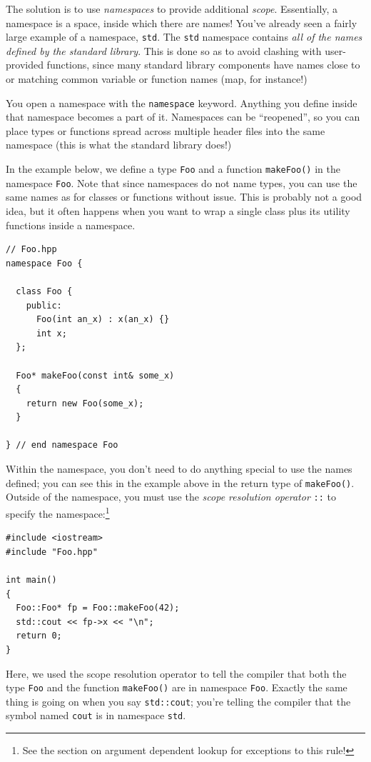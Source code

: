 \documentclass[a4paper]{scrartcl}
\begin{document}
The solution is to use \emph{namespaces} to provide additional \emph{scope}. Essentially, a namespace is a space, inside which there are names! You've already seen a fairly large example of a namespace, \verb|std|. The \verb|std| namespace contains \emph{all of the names defined by the standard library}. This is done so as to avoid clashing with user-provided functions, since many standard library components have names close to or matching common variable or function names (map, for instance!)

You open a namespace with the \verb|namespace| keyword. Anything you define inside that namespace becomes a part of it. Namespaces can be ``reopened'', so you can place types or functions spread across multiple header files into the same namespace (this is what the standard library does!)

In the example below, we define a type \verb|Foo| and a function \verb|makeFoo()| in the namespace \verb|Foo|. Note that since namespaces do not name types, you can use the same names as for classes or functions without issue. This is probably not a good idea, but it often happens when you want to wrap a single class plus its utility functions inside a namespace.

\begin{verbatim}
// Foo.hpp
namespace Foo {
  
  class Foo {
    public:
      Foo(int an_x) : x(an_x) {}
      int x;
  };

  Foo* makeFoo(const int& some_x)
  {
    return new Foo(some_x);
  }

} // end namespace Foo
\end{verbatim}

Within the namespace, you don't need to do anything special to use the names defined; you can see this in the example above in the return type of \verb|makeFoo()|. Outside of the namespace, you must use the \emph{scope resolution operator} \verb|::| to specify the namespace:\footnote{See the section on argument dependent lookup for exceptions to this rule!}

\begin{verbatim}
#include <iostream>
#include "Foo.hpp"

int main()
{
  Foo::Foo* fp = Foo::makeFoo(42);
  std::cout << fp->x << "\n";
  return 0;
}
\end{verbatim}

Here, we used the scope resolution operator to tell the compiler that both the type \verb|Foo| and the function \verb|makeFoo()| are in namespace \verb|Foo|. Exactly the same thing is going on when you say \verb|std::cout|; you're telling the compiler that the symbol named \verb|cout| is in namespace \verb|std|.
\end{document}

